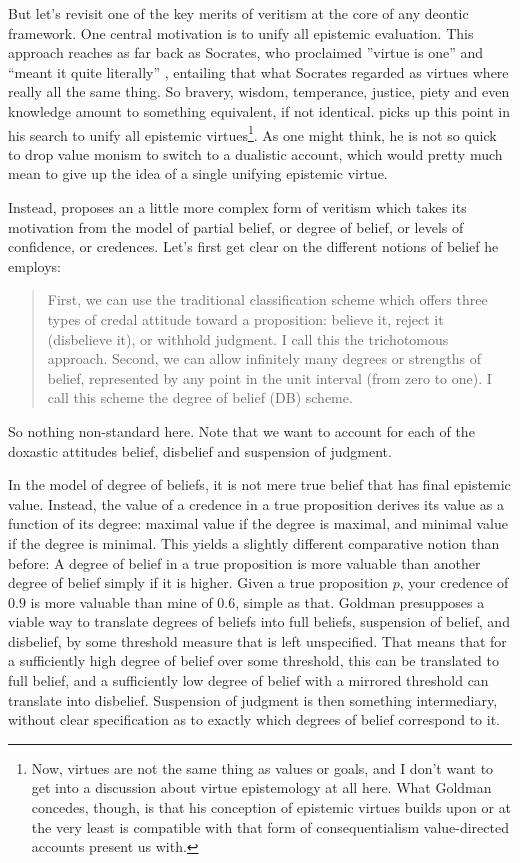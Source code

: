 \documentclass[12pt,numbers=noenddot]{scrartcl}
\begin{document}
But let's revisit one of the key merits of veritism at the core of any deontic framework. One central motivation is to unify all epistemic evaluation. This approach reaches as far back as Socrates, who proclaimed ”virtue is one” and “meant it quite literally” \textcite{penner1973}, entailing that what Socrates regarded as virtues where really all the same thing. So bravery, wisdom, temperance, justice, piety and even knowledge amount to something equivalent, if not identical.
\textcite{Goldman2002-GOLTUO-2} picks up this point in his search to unify all epistemic virtues\footnote{Now, virtues are not the same thing as values or goals, and I don't want to get into a discussion about virtue epistemology at all here. What Goldman concedes, though, is that his conception of epistemic virtues builds upon or at the very least is compatible with that form of consequentialism value-directed accounts present us with.}. As one might think, he is not so quick to drop value monism to switch to a dualistic account, which would pretty much mean to give up the idea of a single unifying epistemic virtue.

Instead, \textcite[58]{Goldman2002-GOLTUO-2} proposes an a little more complex form of veritism which takes its motivation from the model of partial belief, or degree of belief, or levels of confidence, or credences. Let's first get clear on the different notions of belief he employs:

\begin{quote}
    First, we can use the traditional classification scheme which offers three types of credal attitude toward a proposition: believe it, reject it (disbelieve it), or withhold judgment. I call this the trichotomous approach. Second, we can allow infinitely many degrees or strengths of belief, represented by any point in the unit interval (from zero to one). I call this scheme the degree of belief (DB) scheme. \textcite[88]{Goldman1999-GOLKIA}
\end{quote}

So nothing non-standard here. Note that we want to account for each of the doxastic attitudes belief, disbelief and suspension of judgment.

In the model of degree of beliefs, it is not mere true belief that has final epistemic value. Instead, the value of a credence in a true proposition derives its value as a function of its degree: maximal value if the degree is maximal, and minimal value if the degree is minimal. This yields a slightly different comparative notion than before: A degree of belief in a true proposition is more valuable than another degree of belief simply if it is higher. Given a true proposition $p$, your credence of $0.9$ is more valuable than mine of $0.6$, simple as that.
Goldman presupposes a viable way to translate degrees of beliefs into full beliefs, suspension of belief, and disbelief, by some threshold measure that is left unspecified. That means that for a sufficiently high degree of belief over some threshold, this can be translated to full belief, and a sufficiently low degree of belief with a mirrored threshold can translate into disbelief. Suspension of judgment is then something intermediary, without clear specification as to exactly which degrees of belief correspond to it.
\end{document}
